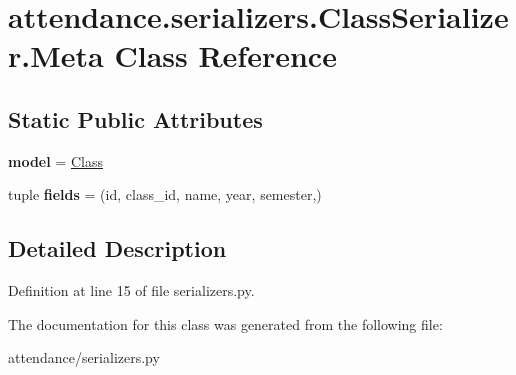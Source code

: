 \hypertarget{classattendance_1_1serializers_1_1_class_serializer_1_1_meta}{}\section{attendance.\+serializers.\+Class\+Serializer.\+Meta Class Reference}
\label{classattendance_1_1serializers_1_1_class_serializer_1_1_meta}
\subsection*{Static Public Attributes}
\begin{DoxyCompactItemize}
\item 
\hypertarget{classattendance_1_1serializers_1_1_class_serializer_1_1_meta_a06bc3ff34401481e4d3f7667affedfa4}{}\label{classattendance_1_1serializers_1_1_class_serializer_1_1_meta_a06bc3ff34401481e4d3f7667affedfa4} 
{\bfseries model} = \hyperlink{classattendance_1_1models_1_1_class}{Class}
\item 
\hypertarget{classattendance_1_1serializers_1_1_class_serializer_1_1_meta_a65761255d21f39668b71a522ebae46eb}{}\label{classattendance_1_1serializers_1_1_class_serializer_1_1_meta_a65761255d21f39668b71a522ebae46eb} 
tuple {\bfseries fields} = (\textquotesingle{}id\textquotesingle{}, \textquotesingle{}class\+\_\+id\textquotesingle{}, \textquotesingle{}name\textquotesingle{}, \textquotesingle{}year\textquotesingle{}, \textquotesingle{}semester\textquotesingle{},)
\end{DoxyCompactItemize}


\subsection{Detailed Description}


Definition at line 15 of file serializers.\+py.



The documentation for this class was generated from the following file\+:\begin{DoxyCompactItemize}
\item 
attendance/serializers.\+py\end{DoxyCompactItemize}
